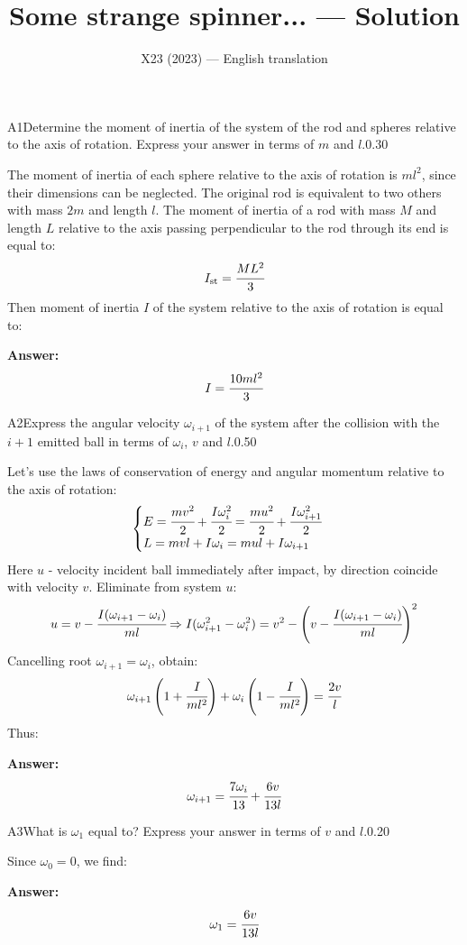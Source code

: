 \documentclass[11pt,a4paper]{article}
\title{\textbf{Some strange spinner... --- Solution}}
\author{\normalsize X23 (2023) — English translation}
\date{}
\begin{document}
\maketitle\vspace{-0.5em}
\begin{solcard}{A1}{Determine the moment of inertia of the system of the rod and spheres relative to the axis of rotation. Express your answer in terms of $m$ and $l$.}{0.30}

The moment of inertia of each sphere relative to the axis of rotation is $ml^2$, since their dimensions can be neglected. The original rod is equivalent to two others with mass $2m$ and length $l$. The moment of inertia of a rod with mass $M$ and length $L$ relative to the axis passing perpendicular to the rod through its end is equal to: $$I_\text{st}=\cfrac{ML^2}{3} $$ Then moment of inertia $I$ of the system relative to the axis of rotation is equal to:
\par\smallskip\noindent\textbf{Answer:} $$I=\cfrac{10ml^2}{3} $$
\end{solcard}
\begin{solcard}{A2}{Express the angular velocity $\omega_{i+1}$ of the system after the collision with the $i+1$ emitted ball in terms of $\omega_i$, $v$ and $l$.}{0.50}

Let's use the laws of conservation of energy and angular momentum relative to the axis of rotation: $$\begin{cases} E=\cfrac{mv^2}{2}+\cfrac{I\omega^2_i}{2}=\cfrac{mu^2}{2}+\cfrac{I\omega^2_{i+1}}{2}\\ L=mvl+I\omega_i=mul+I\omega_{i+1} \end{cases}$$ Here $u$ - velocity incident ball immediately after impact, by direction coincide with velocity $v$. Eliminate from system $u$: $$u=v-\cfrac{I(\omega_{i+1}-\omega_i)}{ml}\Rightarrow I(\omega^2_{i+1}-\omega^2_i)=v^2-\left(v-\cfrac{I(\omega_{i+1}-\omega_i)}{ml}\right)^2 $$ Cancelling root $\omega_{i+1}=\omega_i$, obtain: $$\omega_{i+1}\left(1+\cfrac{I}{ml^2}\right)+\omega_{i}\left(1-\cfrac{I}{ml^2}\right)=\cfrac{2v}{l} $$ Thus:
\par\smallskip\noindent\textbf{Answer:} $$\omega_{i+1}=\cfrac{7\omega_i}{13}+\cfrac{6v}{13l} $$
\end{solcard}
\begin{solcard}{A3}{What is $\omega_1$ equal to? Express your answer in terms of $v$ and $l$.}{0.20}

Since $\omega_0=0$, we find:

\par\smallskip\noindent\textbf{Answer:} $$\omega_1=\cfrac{6v}{13l} $$
\end{solcard}
\end{document}
